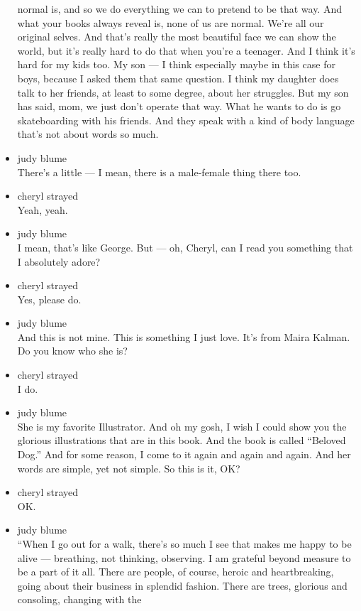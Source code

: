 \begin{itemize}
  normal is, and so we do everything we can to pretend to be that way.
  And what your books always reveal is, none of us are normal. We're all
  our original selves. And that's really the most beautiful face we can
  show the world, but it's really hard to do that when you're a
  teenager. And I think it's hard for my kids too. My son --- I think
  especially maybe in this case for boys, because I asked them that same
  question. I think my daughter does talk to her friends, at least to
  some degree, about her struggles. But my son has said, mom, we just
  don't operate that way. What he wants to do is go skateboarding with
  his friends. And they speak with a kind of body language that's not
  about words so much.
\item
  judy blume\\
  There's a little --- I mean, there is a male-female thing there too.
\item
  cheryl strayed\\
  Yeah, yeah.
\item
  judy blume\\
  I mean, that's like George. But --- oh, Cheryl, can I read you
  something that I absolutely adore?
\item
  cheryl strayed\\
  Yes, please do.
\item
  judy blume\\
  And this is not mine. This is something I just love. It's from Maira
  Kalman. Do you know who she is?
\item
  cheryl strayed\\
  I do.
\item
  judy blume\\
  She is my favorite Illustrator. And oh my gosh, I wish I could show
  you the glorious illustrations that are in this book. And the book is
  called ``Beloved Dog.'' And for some reason, I come to it again and
  again and again. And her words are simple, yet not simple. So this is
  it, OK?
\item
  cheryl strayed\\
  OK.
\item
  judy blume\\
  ``When I go out for a walk, there's so much I see that makes me happy
  to be alive --- breathing, not thinking, observing. I am grateful
  beyond measure to be a part of it all. There are people, of course,
  heroic and heartbreaking, going about their business in splendid
  fashion. There are trees, glorious and consoling, changing with the

\end{itemize}
